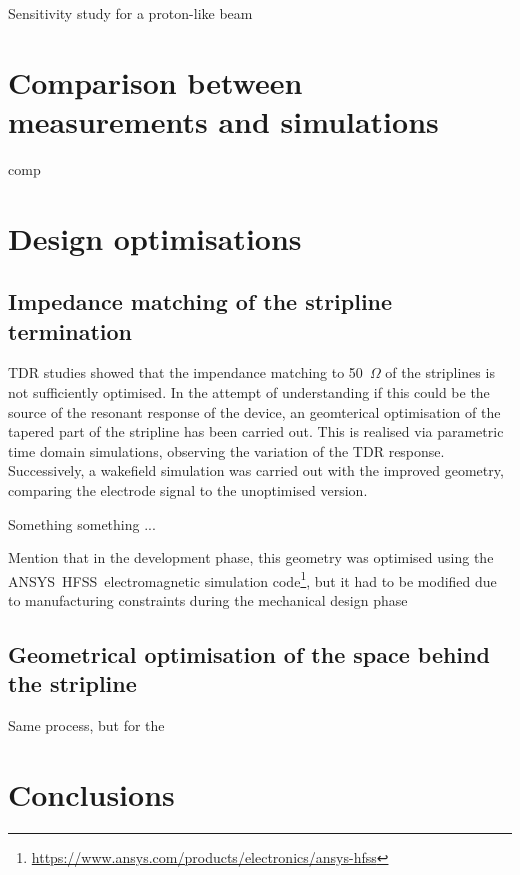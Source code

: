 Sensitivity study for a proton-like beam


\section[Comparison between measurements and simulations]{Comparison between measurements and simulations}

comp


\section[Design optimisations]{Design optimisations}
\label{sec:optimisations}

\subsection[Impedance matching of the stripline termination]{Impedance matching of the stripline termination}

TDR studies showed that the impendance matching to 50~$\Omega$ of the striplines is not sufficiently optimised. In the attempt of understanding if this could be the source of the resonant response of the device, an geomterical optimisation of the tapered part of the stripline has been carried out. This is realised via parametric time domain simulations, observing the variation of the TDR response. Successively, a wakefield simulation was carried out with the improved geometry, comparing the electrode signal to the unoptimised version.

Something something ...

Mention that in the development phase, this geometry was optimised using the ANSYS\textregistered~HFSS\texttrademark~electromagnetic simulation code\footnote{\url{https://www.ansys.com/products/electronics/ansys-hfss}}, but it had to be modified due to manufacturing constraints during the mechanical design phase\cite{Victor:private-comm}


\subsection[Geometrical optimisation of the space behind the stripline]{Geometrical optimisation of the space behind the stripline}

Same process, but for the



\section[Conclusions]{Conclusions}
